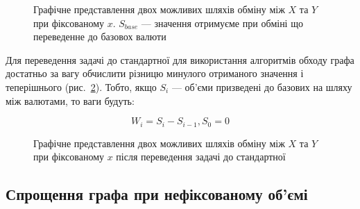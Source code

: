 \documentclass[14pt]{extarticle}
\begin{document}
\begin{figure}[h]
	\centering
	\caption{\label{fig:eval-func-graph-base} Графічне представлення двох можливих
	  шляхів обміну між $X$ та $Y$ при фіксованому $x$. $S_{base}$ --- значення
	  отримуєме при обміні що переведенне до базовох валюти}
\end{figure}

Для переведення задачі до стандартної для використання алгоритмів обходу графа
достатньо за вагу обчислити різницю минулого отриманого значення і теперішнього
(рис.~\ref{fig:eval-func-graph-weight}). Тобто, якщо $S_{i}$ --- об'єми призведені
до базових на шляху між валютами, то ваги будуть:

\begin{equation*}
W_{i} = S_{i} - S_{i-1}, S_{0} = 0
\end{equation*}

\begin{figure}[h]
	\centering
	\caption{\label{fig:eval-func-graph-weight} Графічне представлення двох
	  можливих шляхів обміну між $X$ та $Y$ при фіксованому $x$ після
	  переведення задачі до стандартної}
\end{figure}

\subsection{Спрощення графа при нефіксованому об'ємі}
\end{document}
